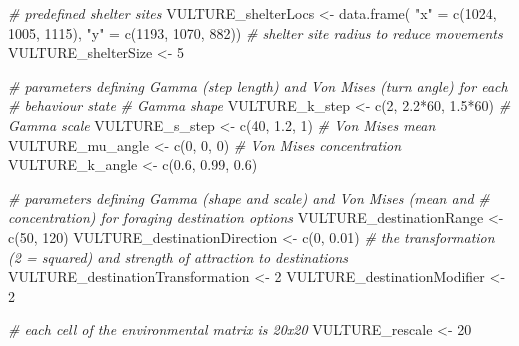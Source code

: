 \documentclass[10pt,a4paper]{article}
\newenvironment{Shaded}{}{}
\newcommand{\CommentTok}[1]{\textit{#1}}
\newcommand{\DecValTok}[1]{#1}
\newcommand{\FloatTok}[1]{#1}
\newcommand{\FunctionTok}[1]{#1}
\newcommand{\NormalTok}[1]{#1}
\newcommand{\OtherTok}[1]{#1}
\newcommand{\SpecialCharTok}[1]{#1}
\newcommand{\StringTok}[1]{#1}
\begin{document}
\begin{Shaded}
\begin{Highlighting}[]
\CommentTok{\# predefined shelter sites}
\NormalTok{VULTURE\_shelterLocs }\OtherTok{\textless{}{-}} \FunctionTok{data.frame}\NormalTok{(}
  \StringTok{"x"} \OtherTok{=} \FunctionTok{c}\NormalTok{(}\DecValTok{1024}\NormalTok{, }\DecValTok{1005}\NormalTok{, }\DecValTok{1115}\NormalTok{),}
  \StringTok{"y"} \OtherTok{=} \FunctionTok{c}\NormalTok{(}\DecValTok{1193}\NormalTok{, }\DecValTok{1070}\NormalTok{, }\DecValTok{882}\NormalTok{))}
\CommentTok{\# shelter site radius to reduce movements}
\NormalTok{VULTURE\_shelterSize }\OtherTok{\textless{}{-}} \DecValTok{5}

\CommentTok{\# parameters defining Gamma (step length) and Von Mises (turn angle) for each}
\CommentTok{\# behaviour state}
\CommentTok{\# Gamma shape}
\NormalTok{VULTURE\_k\_step }\OtherTok{\textless{}{-}} \FunctionTok{c}\NormalTok{(}\DecValTok{2}\NormalTok{, }\FloatTok{2.2}\SpecialCharTok{*}\DecValTok{60}\NormalTok{, }\FloatTok{1.5}\SpecialCharTok{*}\DecValTok{60}\NormalTok{)}
\CommentTok{\# Gamma scale}
\NormalTok{VULTURE\_s\_step }\OtherTok{\textless{}{-}} \FunctionTok{c}\NormalTok{(}\DecValTok{40}\NormalTok{, }\FloatTok{1.2}\NormalTok{, }\DecValTok{1}\NormalTok{)}
\CommentTok{\# Von Mises mean}
\NormalTok{VULTURE\_mu\_angle }\OtherTok{\textless{}{-}} \FunctionTok{c}\NormalTok{(}\DecValTok{0}\NormalTok{, }\DecValTok{0}\NormalTok{, }\DecValTok{0}\NormalTok{)}
\CommentTok{\# Von Mises concentration}
\NormalTok{VULTURE\_k\_angle }\OtherTok{\textless{}{-}} \FunctionTok{c}\NormalTok{(}\FloatTok{0.6}\NormalTok{, }\FloatTok{0.99}\NormalTok{, }\FloatTok{0.6}\NormalTok{)}

\CommentTok{\# parameters defining Gamma (shape and scale) and Von Mises (mean and}
\CommentTok{\# concentration) for foraging destination options}
\NormalTok{VULTURE\_destinationRange }\OtherTok{\textless{}{-}} \FunctionTok{c}\NormalTok{(}\DecValTok{50}\NormalTok{, }\DecValTok{120}\NormalTok{)}
\NormalTok{VULTURE\_destinationDirection }\OtherTok{\textless{}{-}} \FunctionTok{c}\NormalTok{(}\DecValTok{0}\NormalTok{, }\FloatTok{0.01}\NormalTok{)}
\CommentTok{\# the transformation (2 = squared) and strength of attraction to destinations}
\NormalTok{VULTURE\_destinationTransformation }\OtherTok{\textless{}{-}} \DecValTok{2}
\NormalTok{VULTURE\_destinationModifier }\OtherTok{\textless{}{-}} \DecValTok{2}

\CommentTok{\# each cell of the environmental matrix is 20x20}
\NormalTok{VULTURE\_rescale }\OtherTok{\textless{}{-}} \DecValTok{20}


\end{Highlighting}
\end{Shaded}
\end{document}
